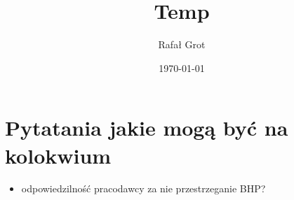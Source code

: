 \documentclass[11pt]{article}
\author{Rafał Grot}
\date{\today}
\title{Temp}
\begin{document}
\maketitle
\tableofcontents

\section{Pytatania jakie mogą być na kolokwium}
\label{sec:orgd2e6058}
\begin{itemize}
\item odpowiedzilność pracodawcy za nie przestrzeganie BHP?
\end{itemize}
\end{document}
